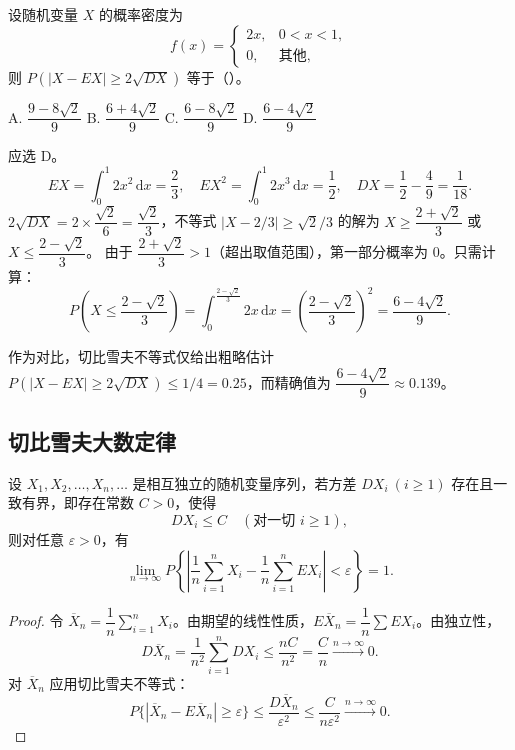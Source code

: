 \documentclass[lang=cn,11pt]{elegantbook}
\begin{document}
\begin{exercise}\label{exer:5-chebyshev-exact}
设随机变量 \(X\) 的概率密度为
\[
f(x) = \begin{cases} 2x, & 0 < x < 1, \\ 0, & \text{其他}, \end{cases}
\]
则 \(P(|X - EX| \geq 2\sqrt{DX})\) 等于（\quad）。\par
A. \(\dfrac{9-8\sqrt{2}}{9}\)\quad
B. \(\dfrac{6+4\sqrt{2}}{9}\)\quad
C. \(\dfrac{6-8\sqrt{2}}{9}\)\quad
D. \(\dfrac{6-4\sqrt{2}}{9}\)
\end{exercise}
\begin{solution}
应选 D。
\[
EX = \int_0^1 2x^2\,\mathrm{d}x = \frac{2}{3},\quad
EX^2 = \int_0^1 2x^3\,\mathrm{d}x = \frac{1}{2},\quad
DX = \frac{1}{2} - \frac{4}{9} = \frac{1}{18}.
\]
\(2\sqrt{DX} = 2 \times \dfrac{\sqrt{2}}{6} = \dfrac{\sqrt{2}}{3}\)，不等式 \(|X - 2/3| \geq \sqrt{2}/3\) 的解为
\(X \geq \dfrac{2+\sqrt{2}}{3}\) 或 \(X \leq \dfrac{2-\sqrt{2}}{3}\)。
由于 \(\dfrac{2+\sqrt{2}}{3} > 1\)（超出取值范围），第一部分概率为 0。只需计算：
\[
P\!\left(X \leq \frac{2-\sqrt{2}}{3}\right) = \int_0^{\frac{2-\sqrt{2}}{3}} 2x\,\mathrm{d}x = \left(\frac{2-\sqrt{2}}{3}\right)^{\!2} = \frac{6-4\sqrt{2}}{9}.
\]
\begin{note}
作为对比，切比雪夫不等式仅给出粗略估计 \(P(|X-EX| \geq 2\sqrt{DX}) \leq 1/4 = 0.25\)，而精确值为 \(\dfrac{6-4\sqrt{2}}{9} \approx 0.139\)。
\end{note}
\end{solution}



\subsection{切比雪夫大数定律}

\begin{theorem}[切比雪夫大数定律] \label{thm:chebyshev-lln}
设 \(X_1, X_2, \dots, X_n, \dots\) 是相互独立的随机变量序列，若方差 \(DX_i\ (i \geq 1)\) 存在且一致有界，即存在常数 \(C > 0\)，使得
\[
DX_i \leq C \quad (\text{对一切 } i \geq 1),
\]
则对任意 \(\varepsilon > 0\)，有
\[
\lim_{n\to\infty} P\!\left\{\left|\frac{1}{n}\sum_{i=1}^{n} X_i - \frac{1}{n}\sum_{i=1}^{n} EX_i\right| < \varepsilon\right\} = 1.
\]
\end{theorem}
\begin{proof}
令 \(\overline{X}_n = \dfrac{1}{n}\sum_{i=1}^{n} X_i\)。由期望的线性性质，\(E\overline{X}_n = \dfrac{1}{n}\sum EX_i\)。由独立性，
\[
D\overline{X}_n = \frac{1}{n^2}\sum_{i=1}^{n} DX_i \leq \frac{nC}{n^2} = \frac{C}{n} \xrightarrow{n\to\infty} 0.
\]
对 \(\overline{X}_n\) 应用切比雪夫不等式：
\[
P\{|\overline{X}_n - E\overline{X}_n| \geqslant \varepsilon\} \leqslant \frac{D\overline{X}_n}{\varepsilon^2} \leqslant \frac{C}{n\varepsilon^2} \xrightarrow{n\to\infty} 0.
\]
\end{proof}
\end{document}
